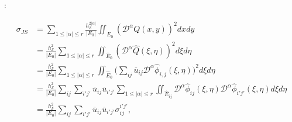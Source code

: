 \documentclass[usenames,dvipsnames,letterpaper,landscape,final]{slides}
\begin{document}
\begin{myslide}

:

\begin{equation}\label{eq:JSsmoothnessIC}
\begin{aligned}
		  \sigma_{JS} &= \sum_{1\leq \lvert \alpha \rvert \leq r}  \frac{h_\mathcal{S}^{2\lvert\alpha\rvert}}{\lvert E_0 \rvert} 
		  \iint_{E_0} (\mathcal{D}^\alpha Q(x,y))^2 dx dy\\
					  &= \frac{h_\mathcal{S}^2}{\lvert E_0 \rvert}\sum_{1\leq \lvert \alpha \rvert \leq r} \iint_{\hat{E}_0} (\mathcal{D}^\alpha\hat{Q}(\xi, \eta))^2 d\xi d\eta \\
					  &= \frac{h_\mathcal{S}^2}{\lvert E_0 \rvert}\sum_{1\leq \lvert \alpha \rvert \leq r} \iint_{\hat{E}_0} \big( \sum_{ij} \overline{u}_{ij} \mathcal{D}^\alpha \hat{\phi}_{i,j}(\xi, \eta) \big)^2 d\xi d\eta \\
					  &= \frac{h_\mathcal{S}^2}{\lvert E_0 \rvert}\sum_{ij} \sum_{i'j'} \overline{u}_{ij} \overline{u}_{i'j'} \sum_{1\leq \lvert \alpha \rvert \leq r} 
					  \iint_{\hat{E}_{ij}} \mathcal{D}^\alpha \hat{\phi}_{ij}(\xi, \eta) 
					  \mathcal{D}^\alpha \hat{\phi}_{i'j'}(\xi, \eta) d\xi d\eta \\
					  &= \frac{h_\mathcal{S}^2}{\lvert E_0 \rvert}\sum_{ij} \sum_{i'j'} \overline{u}_{ij} \overline{u}_{i'j'} \sigma^{i'j'}_{ij},
\end{aligned}
\end{equation}

\end{myslide}
\end{document}
